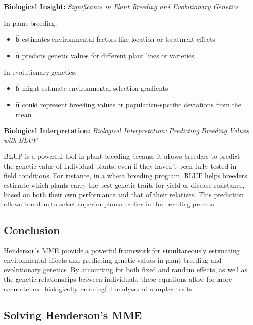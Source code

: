 \documentclass[12pt,a4paper]{article}
\newenvironment{interpretation}[1][]
{\begin{basebox}[linecolor=uqgreen]
\textbf{\color{uqgreen}Biological Interpretation:} \textit{#1}\par\noindent\ignorespaces}
{\end{basebox}}
\newenvironment{biologicalinsightbox}[1][]
{\begin{basebox}[linecolor=uqpurple]
\textbf{\color{uqpurple}Biological Insight:} \textit{#1}\par\noindent\ignorespaces}
{\end{basebox}}
\begin{document}
\begin{biologicalinsightbox}[Significance in Plant Breeding and Evolutionary Genetics]

In plant breeding:
\begin{itemize}
    \item $\hat{\mathbf{b}}$ estimates environmental factors like location or treatment effects
    \item $\hat{\mathbf{u}}$ predicts genetic values for different plant lines or varieties
\end{itemize}

In evolutionary genetics:
\begin{itemize}
    \item $\hat{\mathbf{b}}$ might estimate environmental selection gradients
    \item $\hat{\mathbf{u}}$ could represent breeding values or population-specific deviations from the mean
\end{itemize}
\end{biologicalinsightbox}

\begin{interpretation}[Biological Interpretation: Predicting Breeding Values with BLUP]
BLUP is a powerful tool in plant breeding because it allows breeders to predict the genetic value of individual plants, even if they haven't been fully tested in field conditions. For instance, in a wheat breeding program, BLUP helps breeders estimate which plants carry the best genetic traits for yield or disease resistance, based on both their own performance and that of their relatives. This prediction allows breeders to select superior plants earlier in the breeding process.
\end{interpretation}


\subsection{Conclusion}

Henderson's MME provide a powerful framework for simultaneously estimating environmental effects and predicting genetic values in plant breeding and evolutionary genetics. By accounting for both fixed and random effects, as well as the genetic relationships between individuals, these equations allow for more accurate and biologically meaningful analyses of complex traits.

\subsection{Solving Henderson's MME}
\end{document}
